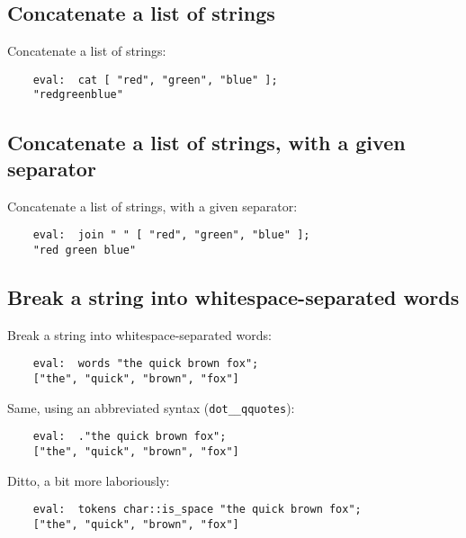 \cutend*

\subsection{Concatenate a list of strings}

Concatenate a list of strings:
\begin{verbatim}
    eval:  cat [ "red", "green", "blue" ];
    "redgreenblue"
\end{verbatim}

\cutend*

\subsection{Concatenate a list of strings, with a given separator}

Concatenate a list of strings, with a given separator:
\begin{verbatim}
    eval:  join " " [ "red", "green", "blue" ];
    "red green blue"
\end{verbatim}

\cutend*

\subsection{Break a string into whitespace-separated words}

Break a string into whitespace-separated words:
\begin{verbatim}
    eval:  words "the quick brown fox";
    ["the", "quick", "brown", "fox"]
\end{verbatim}

Same, using an abbreviated syntax ({\tt dot\_\_qquotes}):

\begin{verbatim}
    eval:  ."the quick brown fox";
    ["the", "quick", "brown", "fox"]
\end{verbatim}

Ditto, a bit more laboriously:
\begin{verbatim}
    eval:  tokens char::is_space "the quick brown fox";
    ["the", "quick", "brown", "fox"]
\end{verbatim}

